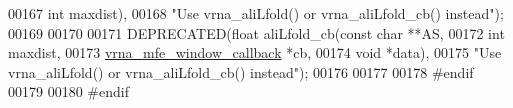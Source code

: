 \begin{DoxyCode}
00167                \textcolor{keywordtype}{int}        maxdist),
00168 \textcolor{stringliteral}{"Use vrna\_aliLfold() or vrna\_aliLfold\_cb() instead"});
00169 
00170 
00171 DEPRECATED(\textcolor{keywordtype}{float} aliLfold\_cb(\textcolor{keyword}{const} \textcolor{keywordtype}{char}                **AS,
00172                   \textcolor{keywordtype}{int}                       maxdist,
00173                   \hyperlink{group__mfe__fold_ga4f3e5bc214ef803074ace313cb9571b4}{vrna\_mfe\_window\_callback}  *cb,
00174                   \textcolor{keywordtype}{void}                      *data),
00175 \textcolor{stringliteral}{"Use vrna\_aliLfold() or vrna\_aliLfold\_cb() instead"});
00176 
00177 
00178 \textcolor{preprocessor}{#endif}
00179 
00180 \textcolor{preprocessor}{#endif}
\end{DoxyCode}
